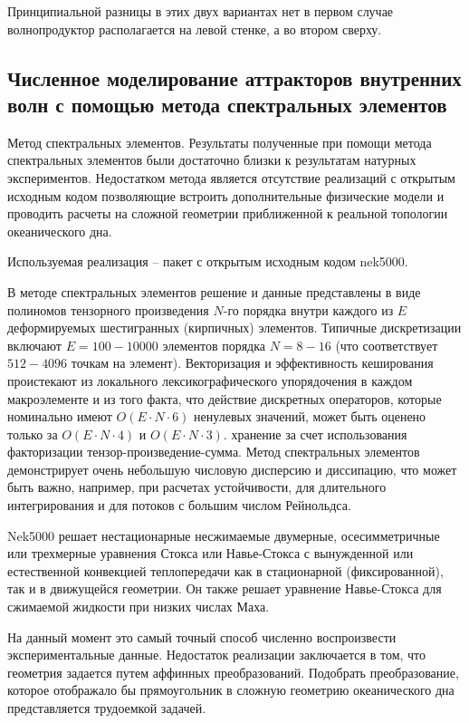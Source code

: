 Принципиальной разницы в этих двух вариантах нет в первом случае волнопродуктор располагается на левой стенке, а во втором сверху.

\subsection{Численное моделирование аттракторов внутренних волн с помощью метода спектральных элементов}

Метод спектральных элементов\cite{Patera1984}. Результаты полученные при помощи метода спектральных элементов были достаточно близки к результатам натурных экспериментов\cite{Brouzet2016,Brouzet_2016}. Недостатком метода является отсутствие реализаций с открытым исходным кодом позволяющие встроить дополнительные физические модели и проводить расчеты на сложной геометрии приближенной к реальной топологии океанического дна.

Используемая реализация -- пакет с открытым исходным кодом nek5000\cite{NEK5000}. 

В методе спектральных элементов решение и данные представлены в виде полиномов тензорного произведения $N$-го порядка внутри каждого из $E$ деформируемых шестигранных (кирпичных) элементов. Типичные дискретизации включают $E = 100 - 10 000$ элементов порядка $N = 8 - 16$ (что соответствует $512 - 4096$ точкам на элемент). Векторизация и эффективность кеширования проистекают из локального лексикографического упорядочения в каждом макроэлементе и из того факта, что действие дискретных операторов, которые номинально имеют $O(E\cdot N \cdot 6)$ ненулевых значений, может быть оценено только за $O(E\cdot N \cdot 4)$ и $O(E\cdot N\cdot 3)$. хранение за счет использования факторизации тензор-произведение-сумма. Метод спектральных элементов демонстрирует очень небольшую числовую дисперсию и диссипацию, что может быть важно, например, при расчетах устойчивости, для длительного интегрирования и для потоков с большим числом Рейнольдса.

Nek5000 решает нестационарные несжимаемые двумерные, осесимметричные или трехмерные уравнения Стокса или Навье-Стокса с вынужденной или естественной конвекцией теплопередачи как в стационарной (фиксированной), так и в движущейся геометрии. Он также решает уравнение Навье-Стокса для сжимаемой жидкости при низких числах Маха.

На данный момент это самый точный способ численно воспроизвести экспериментальные данные\cite{Brouzet2016,Brouzet_2016}. Недостаток реализации заключается в том, что геометрия задается путем аффинных преобразований. Подобрать преобразование, которое отображало бы прямоугольник в сложную геометрию океанического дна представляется трудоемкой задачей. 

